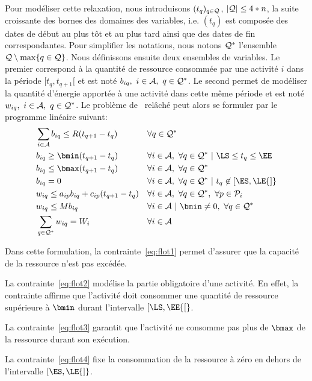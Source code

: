 Pour modéliser cette relaxation, nous introduisons $(t_q)_{q \in {\cal Q}}$,
$| {\cal Q} | \le 4*n$, la suite croissante des bornes des domaines des
variables, i.e. $(t_q)$ est composée des dates de début au plus tôt et
au plus tard ainsi que des dates de fin correspondantes. Pour
simplifier les notations, nous notons ${\cal Q}^* $ l'ensemble ${\cal Q}
\setminus\max\{q \in {\cal Q}\}$. Nous définissons ensuite deux ensembles de
variables. Le premier correspond à la quantité de ressource consommée 
par une activité $i$ dans la période $[t_q,t_{q+1}[$ et est noté
$b_{iq},\ i \in {\cal A},\ q \in {\cal Q}^*$. Le second permet de modéliser la
quantité d'énergie apportée à une activité dans cette même période et
est noté $w_{iq},\ i \in {\cal A},\ q \in {\cal Q}^*$. Le problème de
\CECSP~relâché peut alors se formuler par le programme linéaire suivant:
\begin{align}
  &\sum_{i \in \A} b_{iq} \le R(t_{q+1}- t_q) & & 
  \forall q \in \Q^* \label{eq:flot1}\\
  &b_{iq} \ge \bmin (t_{q+1}-t_q) & & \forall i \in \A,
  \ \forall q \in \Q^*\ | \ \LS \le t_q \le \EE \label{eq:flot2}\\
  &b_{iq} \le \bmax (t_{q+1} - t_q) & &
  \forall i \in \A,\ \forall q \in \Q^* \label{eq:flot3}\\
  &b_{iq}=0 & & \forall i \in \A, \ 
  \forall q \in \Q^*\  |\ t_q \not\in [\ES,\LE{]} \label{eq:flot4}\\  
  &w_{iq} \le a_{ip}b_{iq}+c_{ip}(t_{q+1}-t_q) & &
  \forall i \in \A, \ \forall q \in \Q^*,\  \forall p \in \P_i \label{eq:flot5}\\
  &w_{iq} \le Mb_{iq} & &
  \forall i \in \A\ |\ \bmin\neq 0,\ \forall q \in \Q^*\ \label{eq:flot6}\\
  &\sum_{q\in \Q^*} w_{iq} = W_i  & &
  \forall i \in \A \label{eq:flot7}
  \end{align}

Dans cette formulation, la contrainte~\eqref{eq:flot1} permet
d'assurer que la capacité de la ressource n'est pas excédée. 

La contrainte~\eqref{eq:flot2} modélise la partie
obligatoire d'une activité. En effet, la contrainte affirme que
l'activité doit consommer une quantité de ressource supérieure à
$\bmin$ durant l'intervalle $[\LS,\EE{[}$.

La contrainte~\eqref{eq:flot3}  garantit que l'activité ne consomme
pas plus de $\bmax$ de la ressource durant son exécution. 

La contrainte~\eqref{eq:flot4} fixe la consommation de la ressource à
zéro en dehors de l'intervalle $[\ES,\LE{]}$.

